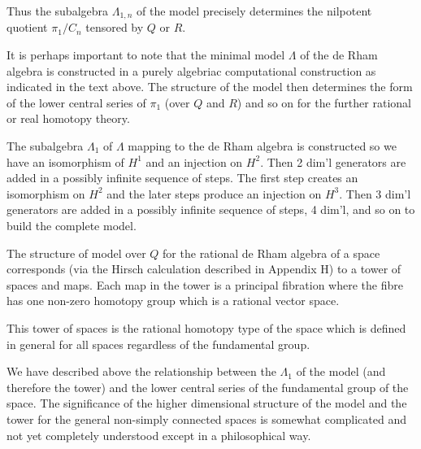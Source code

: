 Thus the subalgebra $\Lambda_{1,n}$ of the model precisely determines the nilpotent quotient $\pi_1/C_n$ tensored by $Q$ or $R$.

It is perhaps important to note that the minimal model $\Lambda$ of the de Rham algebra is constructed in a purely algebriac computational construction as indicated in the text above. The structure of the model then determines the form of the lower central series of $\pi_1$ (over $Q$ and $R$) and so on for\unsure{:} the further rational or real homotopy theory.

The subalgebra $\Lambda_1$ of $\Lambda$ mapping to the de Rham algebra is constructed so we have an isomorphism of $H^1$ and an injection on $H^2$. Then 2 dim'l generators are added in a possibly infinite sequence of steps. The first step creates an isomorphism on $H^2$ and the later steps produce an injection on $H^3$. Then 3 dim'l generators are added in a possibly infinite sequence of steps, 4 dim'l, and so on to build the complete model.

The structure of model over $Q$ for the rational de Rham algebra of a space corresponds (via the Hirsch calculation described in Appendix H) to a tower of spaces and maps. Each map in the tower is a principal fibration where the fibre has one non-zero homotopy group which is a rational vector space.

This tower of spaces is the rational homotopy type of the space which is defined in general for all spaces regardless of the fundamental group.

We have described above the relationship between the $\Lambda_1$ of the model (and therefore the tower) and the lower central\unsure{:} series of the fundamental group of the space. The significance of the higher dimensional structure of the model and the tower for the general non-simply connected spaces\unsure{\textperiodcentered} is somewhat complicated and not yet completely understood except in a philosophical way.
